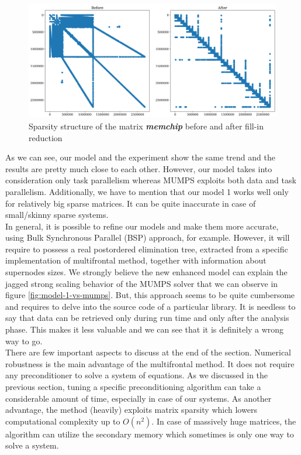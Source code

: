 \figpointer{\ref{fig:memchip-matrix-sparsity-pattern}}
\begin{figure}[htpb]
  \centering
  \includegraphics[width=1.00\textwidth]{figures/chapter-2/memchip-matrix-sparsity-pattern.png}
\caption{Sparsity structure of the matrix \textit{\textbf{memchip}} before and after fill-in reduction}
\label{fig:memchip-matrix-sparsity-pattern}
\end{figure}




As we can see, our model and the experiment show the same trend and the results are pretty much close to each other. However, our model takes into consideration only task parallelism whereas MUMPS exploits both data and task parallelism. Additionally, we have to mention that our model 1 works well only for relatively big sparse matrices. It can be quite inaccurate in case of small/skinny sparse systems. \\


In general, it is possible to refine our models and make them more accurate, using Bulk Synchronous Parallel (BSP) approach, for example. However, it will require to possess a real postordered elimination tree, extracted from a specific implementation of multifrontal method, together with information about supernodes sizes. We strongly believe the new enhanced model can explain the jagged strong scaling behavior of the MUMPS solver that we can observe in figure \ref{fig:model-1-vs-mumps}. But, this approach seems to be quite cumbersome and requires to delve into the source code of a particular library. It is needless to say that data can be retrieved only during run time and only after the analysis phase. This makes it less valuable and we can see that it is definitely a wrong way to go.\\


There are few important aspects to discuss at the end of the section. Numerical robustness is the main advantage of the multifrontal method. It does not require any preconditioner to solve a system of equations. As we discussed in the previous section, tuning a specific preconditioning algorithm can take a considerable amount of time, especially in case of our systems. As another advantage, the method (heavily) exploits matrix sparsity which lowers computational complexity up to $O(n^2)$. In case of massively huge matrices, the algorithm can utilize the secondary memory which sometimes is only one way to solve a system.\\


